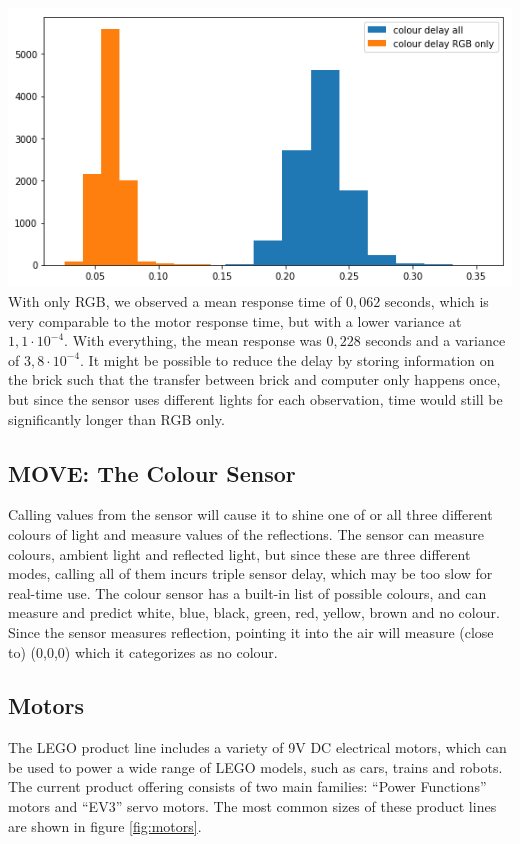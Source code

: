 \documentclass[11pt, a4paper]{article}
\begin{document}
\includegraphics[scale=0.7]{images/colour_response_histogram.png} \\
With only RGB, we observed a mean response time of $0,062$ seconds, which is very comparable to the motor response time, but with a lower variance at $1,1\cdot 10^{-4}$. With everything, the mean response was $0,228$ seconds and a variance of $3,8 \cdot 10^{-4}$. It might be possible to reduce the delay by storing information on the brick such that the transfer between brick and computer only happens once, but since the sensor uses different lights for each observation, time would still be significantly longer than RGB only.


\subsection{MOVE: The Colour Sensor}
Calling values from the sensor will cause it to shine one of or all three different colours of light and measure values of the reflections. The sensor can measure colours, ambient light and reflected light, but since these are three different modes, calling all of them incurs triple sensor delay, which may be too slow for real-time use. The colour sensor has a built-in list of possible colours, and can measure and predict white, blue, black, green, red, yellow, brown and no colour. Since the sensor measures reflection, pointing it into the air will measure (close to) (0,0,0) which it categorizes as no colour.


\subsection{Motors}
The LEGO product line includes a variety of 9V DC electrical motors, which can be used to power a wide range of LEGO models, such as cars, trains and robots. The current product offering consists of two main families: ``Power Functions'' motors and ``EV3'' servo motors. The most common sizes of these product lines are shown in figure \ref{fig:motors}.
\end{document}
